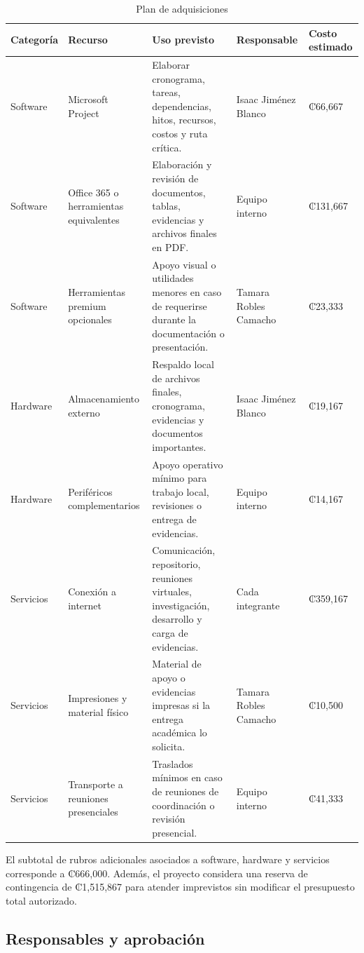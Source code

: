 \documentclass[11pt,spanish]{article}
\begin{document}
\begin{table}[H]
\centering
\caption{Plan de adquisiciones}
\label{tab:plan-adquisiciones}
{\scriptsize
\begin{tabularx}{\textwidth}{p{2.6cm} p{3.3cm} Y p{2.4cm} p{2.1cm}}
\toprule
\textbf{Categoría} & \textbf{Recurso} & \textbf{Uso previsto} & \textbf{Responsable} & \textbf{Costo estimado} \\
\midrule
Software & Microsoft Project & Elaborar cronograma, tareas, dependencias, hitos, recursos, costos y ruta crítica. & Isaac Jiménez Blanco & ₡66,667 \\
Software & Office 365 o herramientas equivalentes & Elaboración y revisión de documentos, tablas, evidencias y archivos finales en PDF. & Equipo interno & ₡131,667 \\
Software & Herramientas premium opcionales & Apoyo visual o utilidades menores en caso de requerirse durante la documentación o presentación. & Tamara Robles Camacho & ₡23,333 \\
Hardware & Almacenamiento externo & Respaldo local de archivos finales, cronograma, evidencias y documentos importantes. & Isaac Jiménez Blanco & ₡19,167 \\
Hardware & Periféricos complementarios & Apoyo operativo mínimo para trabajo local, revisiones o entrega de evidencias. & Equipo interno & ₡14,167 \\
Servicios & Conexión a internet & Comunicación, repositorio, reuniones virtuales, investigación, desarrollo y carga de evidencias. & Cada integrante & ₡359,167 \\
Servicios & Impresiones y material físico & Material de apoyo o evidencias impresas si la entrega académica lo solicita. & Tamara Robles Camacho & ₡10,500 \\
Servicios & Transporte a reuniones presenciales & Traslados mínimos en caso de reuniones de coordinación o revisión presencial. & Equipo interno & ₡41,333 \\
\bottomrule
\end{tabularx}
}
\end{table}

El subtotal de rubros adicionales asociados a software, hardware y servicios corresponde a ₡666,000. Además, el proyecto considera una reserva de contingencia de ₡1,515,867 para atender imprevistos sin modificar el presupuesto total autorizado.

\subsection{Responsables y aprobación}
\end{document}
